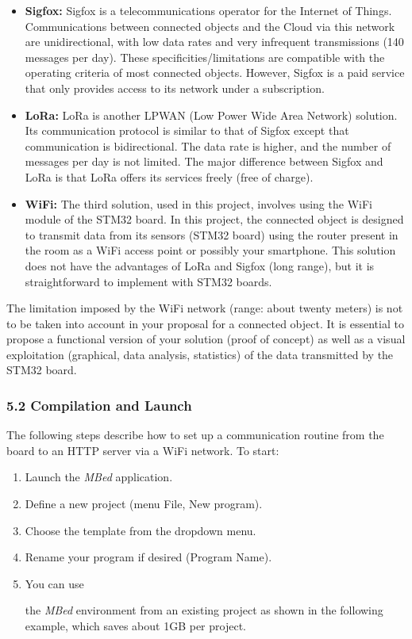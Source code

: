 \documentclass[10pt,a4paper,onecolumn]{article}
\let\textttOrig=\texttt
\def\texttt#1{\expandafter\textttOrig{\seqsplit{#1}}}
\begin{document}
\begin{itemize}
    \item \textbf{Sigfox:} Sigfox is a telecommunications operator for the Internet of Things. Communications between connected objects and the Cloud via this network are unidirectional, with low data rates and very infrequent transmissions (140 messages per day). These specificities/limitations are compatible with the operating criteria of most connected objects. However, Sigfox is a paid service that only provides access to its network under a subscription.
    
    \item \textbf{LoRa:} LoRa is another LPWAN (Low Power Wide Area Network) solution. Its communication protocol is similar to that of Sigfox except that communication is bidirectional. The data rate is higher, and the number of messages per day is not limited. The major difference between Sigfox and LoRa is that LoRa offers its services freely (free of charge).
    
    \item \textbf{WiFi:} The third solution, used in this project, involves using the WiFi module of the STM32 board. In this project, the connected object is designed to transmit data from its sensors (STM32 board) using the router present in the room as a WiFi access point or possibly your smartphone. This solution does not have the advantages of LoRa and Sigfox (long range), but it is straightforward to implement with STM32 boards.
\end{itemize}

The limitation imposed by the WiFi network (range: about twenty meters) is not to be taken into account in your proposal for a connected object. It is essential to propose a functional version of your solution (proof of concept) as well as a visual exploitation (graphical, data analysis, statistics) of the data transmitted by the STM32 board.

\hypertarget{compilation-and-launch}{%
\subsubsection{5.2 Compilation and
Launch}\label{compilation-and-launch}}

The following steps describe how to set up a communication routine from the board to an HTTP server via a WiFi network. To start:

\begin{enumerate}
    \item Launch the \textit{MBed} application.
    \item Define a new project (menu File, New program).
    \item Choose the template \texttt{mbed-os-example-sockets} from the dropdown menu.
    \item Rename your program if desired (Program Name).
    \item You can use

 the \textit{MBed} environment from an existing project as shown in the following example, which saves about 1GB per project.
\end{enumerate}
\end{document}

